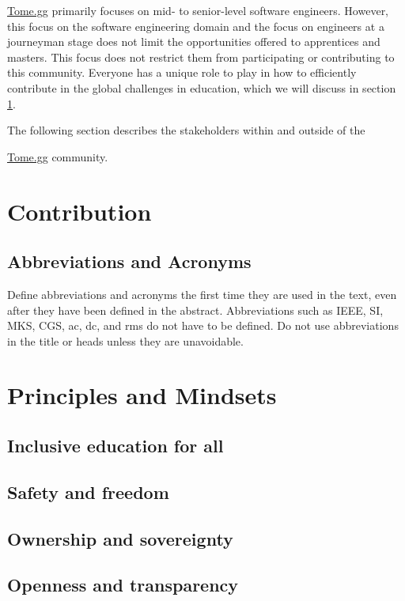 \documentclass[conference]{IEEEtran}
\newcommand{\tomegg}{
  \href{http://tome.gg}{Tome.gg}
}
\begin{document}
\tomegg primarily focuses on mid- to senior-level software engineers. However, 
this focus on the software engineering domain and the focus on engineers at a
journeyman stage does not limit the opportunities offered to apprentices and 
masters. This focus does not restrict them from participating or contributing 
to this community. Everyone has a unique role to play in how to efficiently 
contribute in the global challenges in education, which we will discuss in 
section \ref{sec:contribution}.

The following section describes the stakeholders within and outside of the
\tomegg community.

\section{Contribution}
\label{sec:contribution}

\subsection{Abbreviations and Acronyms}\label{AA}
Define abbreviations and acronyms the first time they are used in the text, 
even after they have been defined in the abstract. Abbreviations such as 
IEEE, SI, MKS, CGS, ac, dc, and rms do not have to be defined. Do not use 
abbreviations in the title or heads unless they are unavoidable.

\section{Principles and Mindsets}
\label{sec:principles_mindsets}

\subsection{Inclusive education for all}

\subsection{Safety and freedom}

\subsection{Ownership and sovereignty}

\subsection{Openness and transparency}
\end{document}
